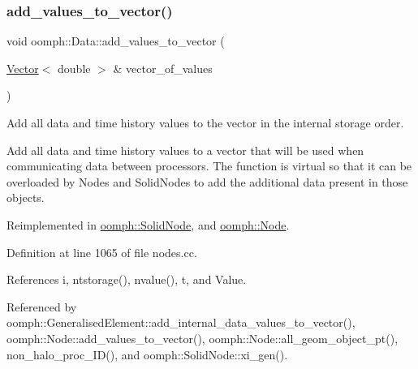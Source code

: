 \mbox{\label{classoomph_1_1Data_a6c40a2fbaf44f976d71d9768e1c9ccfa}} 
\subsubsection{\texorpdfstring{add\+\_\+values\+\_\+to\+\_\+vector()}{add\_values\_to\_vector()}}
{\footnotesize\ttfamily void oomph\+::\+Data\+::add\+\_\+values\+\_\+to\+\_\+vector (\begin{DoxyParamCaption}\item[{\hyperlink{classoomph_1_1Vector}{Vector}$<$ double $>$ \&}]{vector\+\_\+of\+\_\+values }\end{DoxyParamCaption})\hspace{0.3cm}{\ttfamily [virtual]}}



Add all data and time history values to the vector in the internal storage order. 

Add all data and time history values to a vector that will be used when communicating data between processors. The function is virtual so that it can be overloaded by Nodes and Solid\+Nodes to add the additional data present in those objects. 

Reimplemented in \hyperlink{classoomph_1_1SolidNode_a20562ea5133c1150b6999a73badb63e8}{oomph\+::\+Solid\+Node}, and \hyperlink{classoomph_1_1Node_a11400682e1fd2851777234a779e8bf8d}{oomph\+::\+Node}.



Definition at line 1065 of file nodes.\+cc.



References i, ntstorage(), nvalue(), t, and Value.



Referenced by oomph\+::\+Generalised\+Element\+::add\+\_\+internal\+\_\+data\+\_\+values\+\_\+to\+\_\+vector(), oomph\+::\+Node\+::add\+\_\+values\+\_\+to\+\_\+vector(), oomph\+::\+Node\+::all\+\_\+geom\+\_\+object\+\_\+pt(), non\+\_\+halo\+\_\+proc\+\_\+\+I\+D(), and oomph\+::\+Solid\+Node\+::xi\+\_\+gen().

\mbox{\label{classoomph_1_1Data_a7b26834562644d212f8bb5c7ed482c61}} 
